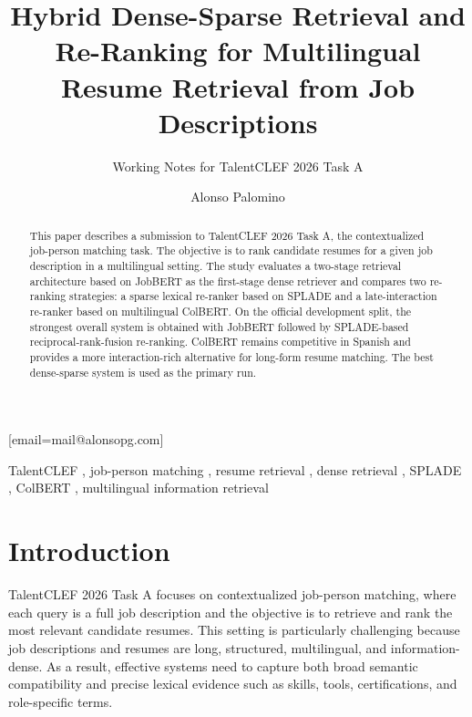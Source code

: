 \documentclass[
]{ceurart}
\begin{document}


\title{Hybrid Dense-Sparse Retrieval and Re-Ranking for Multilingual Resume Retrieval from Job Descriptions}
\tnotemark[1]
\subtitle{Working Notes for TalentCLEF 2026 Task A}

\author{Alonso Palomino}[email=mail@alonsopg.com]
\cormark[1]

\begin{abstract}
This paper describes a submission to TalentCLEF 2026 Task A, the contextualized
job-person matching task. The objective is to rank candidate resumes for a given
job description in a multilingual setting. The study evaluates a two-stage retrieval architecture
based on JobBERT as the first-stage dense retriever and compares two re-ranking strategies:
a sparse lexical re-ranker based on SPLADE and a late-interaction re-ranker based on
multilingual ColBERT. On the official development split, the strongest overall system
is obtained with JobBERT followed by SPLADE-based reciprocal-rank-fusion re-ranking.
ColBERT remains competitive in Spanish and provides a more interaction-rich alternative
for long-form resume matching. The best dense-sparse system is used as the primary run.
\end{abstract}

\begin{keywords}
TalentCLEF \sep
job-person matching \sep
resume retrieval \sep
dense retrieval \sep
SPLADE \sep
ColBERT \sep
multilingual information retrieval
\end{keywords}

\maketitle

\section{Introduction}

TalentCLEF 2026 Task A focuses on contextualized job-person matching, where each
query is a full job description and the objective is to retrieve and rank the most
relevant candidate resumes. This setting is particularly challenging because job
descriptions and resumes are long, structured, multilingual, and information-dense.
As a result, effective systems need to capture both broad semantic compatibility and
precise lexical evidence such as skills, tools, certifications, and role-specific terms.
\end{document}

